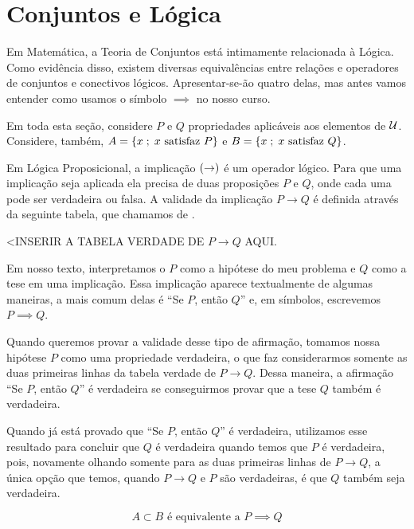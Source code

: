 \section{Conjuntos e Lógica}

\noindent
Em Matemática, a Teoria de Conjuntos está intimamente relacionada à Lógica.
Como evidência disso, existem diversas equivalências entre relações e operadores de conjuntos e conectivos lógicos.
Apresentar-se-ão quatro delas, mas antes vamos entender como usamos o símbolo $ \implies$ no nosso curso.

	\begin{remark}
	Em toda esta seção, considere $P$ e $Q$ propriedades aplicáveis aos elementos de $\mathcal{U}$.
	Considere, também, $A = \left\{ x \;;\; x \text{ satisfaz } P\right\}$ e $B= \left\{ x \;;\; x \text{ satisfaz } Q\right\}$.
	\end{remark}

Em Lógica Proposicional, a implicação $\left(\to\right) $ é um operador lógico. 
Para que uma implicação seja aplicada ela precisa de duas proposições $P$ e $Q$, 
onde cada uma pode ser verdadeira ou falsa.
A validade da implicação $P \to Q$ é definida através da seguinte tabela, que chamamos de .

<INSERIR A TABELA VERDADE DE $P \to Q$ AQUI.

Em nosso texto, interpretamos o $P$ como a hipótese do meu problema e $Q$ como a tese em uma implicação.
Essa implicação aparece textualmente de algumas maneiras, a mais comum delas é ``Se $P$, então $Q$'' 
e, em símbolos, escrevemos $P \implies Q$.

Quando queremos provar a validade desse tipo de afirmação, 
tomamos nossa hipótese $P$ como uma propriedade verdadeira, 
o que faz considerarmos somente as duas primeiras linhas da tabela verdade de $P \to Q$.
Dessa maneira, a afirmação ``Se $P$, então $Q$'' é verdadeira se conseguirmos provar que a tese $Q$ também é verdadeira.

Quando já está provado que ``Se $P$, então $Q$'' é verdadeira, 
utilizamos esse resultado para concluir que $Q$ é verdadeira quando temos que $P$ é verdadeira, 
pois, novamente olhando somente para as duas primeiras linhas de $P \to Q$, 
a única opção que temos, quando $P \to Q$ e $P$ são verdadeiras, é que $Q$ também seja verdadeira.

\begin{equivalence} 
$$A \subset B \text{ é equivalente a } P \implies Q$$
\end{equivalence}

